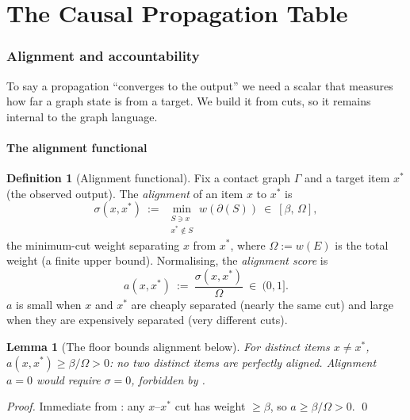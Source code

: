 \documentclass[11pt,a4paper]{article}
\theoremstyle{thmstyle}
\newtheorem{lemma}[theorem]{Lemma}
\theoremstyle{definition}
\newtheorem{definition}[theorem]{Definition}
\theoremstyle{remark}
\newcommand{\Gph}{\Gamma}
\newcommand{\E}{E}
\newcommand{\wt}{w}
\newcommand{\flo}{\beta}                 %
\newcommand{\cut}{\partial}              %
\newcommand{\str}{\sigma}                %
\begin{document}
\part{The Causal Propagation Table}

\section{Alignment and accountability}
\label{sec:alignment}

To say a propagation ``converges to the output'' we need a scalar that
measures how far a graph state is from a target. We build it from cuts, so
it remains internal to the graph language.

\subsection{The alignment functional}

\begin{definition}[Alignment functional]
\label{def:alignment}
Fix a contact graph $\Gph$ and a target item $x^{\ast}$ (the observed
output). The \emph{alignment} of an item $x$ to $x^{\ast}$ is
\[
\str(x,x^{\ast})\ :=\ \min_{\substack{S\ni x\\ x^{\ast}\notin S}}
\wt(\cut(S))\ \in\ [\flo,\,\Omega],
\]
the minimum-cut weight separating $x$ from $x^{\ast}$, where
$\Omega:=\wt(\E)$ is the total weight (a finite upper bound). Normalising,
the \emph{alignment score} is
\[
a(x,x^{\ast})\ :=\ \frac{\str(x,x^{\ast})}{\Omega}\ \in\ (0,1].
\]
$a$ is small when $x$ and $x^{\ast}$ are cheaply separated (nearly the same
cut) and large when they are expensively separated (very different cuts).
\end{definition}

\begin{lemma}[The floor bounds alignment below]
\label{lem:align-floor}
For distinct items $x\neq x^{\ast}$, $a(x,x^{\ast})\ge\flo/\Omega>0$:
no two distinct items are perfectly aligned. Alignment $a=0$ would require
$\str=0$, forbidden by .
\end{lemma}

\begin{proof}
Immediate from : any $x$--$x^{\ast}$ cut has weight
$\ge\flo$, so $a\ge\flo/\Omega>0$. \qed
\end{proof}
\end{document}
